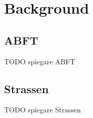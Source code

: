 \section{Background}

\subsection{ABFT}
TODO spiegare ABFT
\subsection{Strassen}
TODO spiegare Strassen
